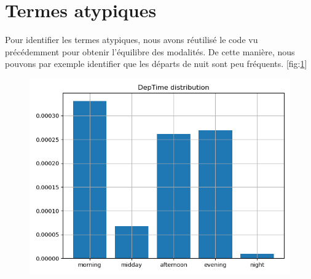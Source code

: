 \section{Termes atypiques}
  Pour identifier les termes atypiques, nous avons réutilisé le code vu précédemment pour obtenir l'équilibre des modalités.
  De cette manière, nous pouvons par exemple identifier que les départs de nuit sont peu fréquents. [fig:\ref{fig:DepTime}]

\begin{figure}[H]
  \centering
  \includegraphics[scale=1]{images/DepTime_distribution.png}
  \caption{}
  \label{fig:DepTime}
\end{figure}

